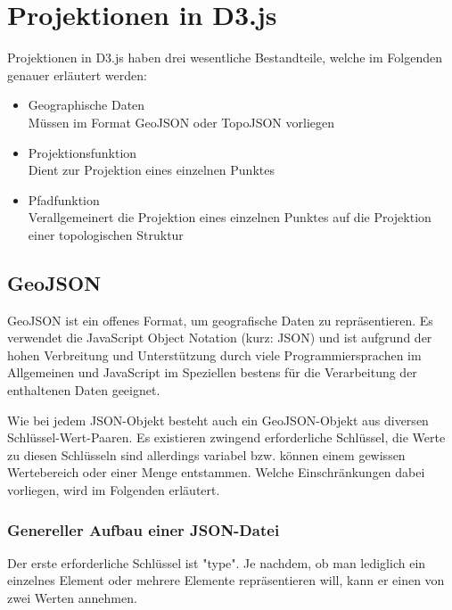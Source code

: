 \chapter{Projektionen in D3.js}
\label{ch:projections-in-d3js}

Projektionen in D3.js haben drei wesentliche Bestandteile, welche im Folgenden genauer erläutert werden:

\begin{itemize}
    \item Geographische Daten
            \\Müssen im Format GeoJSON oder TopoJSON vorliegen
    \item Projektionsfunktion
            \\Dient zur Projektion eines einzelnen Punktes
    \item Pfadfunktion
            \\Verallgemeinert die Projektion eines einzelnen Punktes auf die Projektion einer topologischen Struktur
\end{itemize}

\section{GeoJSON}

GeoJSON ist ein offenes Format, um geografische Daten zu repräsentieren. Es verwendet die JavaScript Object Notation (kurz: JSON) und ist aufgrund der hohen Verbreitung und Unterstützung durch viele Programmiersprachen im Allgemeinen und JavaScript im Speziellen bestens für die Verarbeitung der enthaltenen Daten geeignet.

Wie bei jedem JSON-Objekt besteht auch ein GeoJSON-Objekt aus diversen Schlüssel-Wert-Paaren. Es existieren zwingend erforderliche Schlüssel, die Werte zu diesen Schlüsseln sind allerdings variabel bzw. können einem gewissen Wertebereich oder einer Menge entstammen. Welche Einschränkungen dabei vorliegen, wird im Folgenden erläutert.

\subsection{Genereller Aufbau einer JSON-Datei}

Der erste erforderliche Schlüssel ist "type". Je nachdem, ob man lediglich ein einzelnes Element oder mehrere Elemente repräsentieren will, kann er einen von zwei Werten annehmen.

